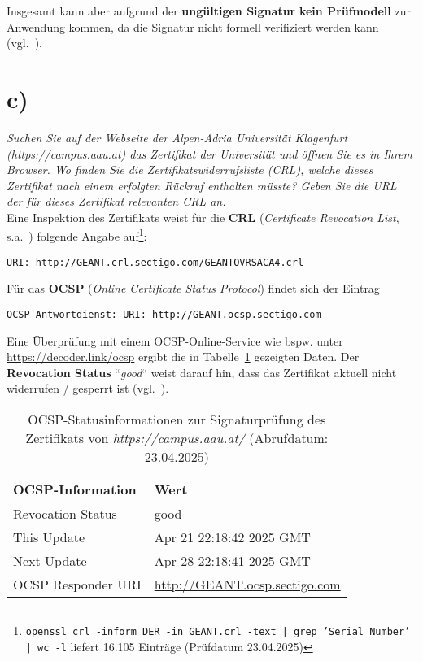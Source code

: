 \noindent
Insgesamt kann aber aufgrund der \textbf{ungültigen Signatur} \textbf{kein Prüfmodell} zur Anwendung kommen, da die Signatur nicht formell verifiziert werden kann (vgl.~\cite[27]{ITS6}).

\section{c)}

\textit{Suchen Sie auf der Webseite der Alpen-Adria Universität Klagenfurt
    (https://campus.aau.at) das Zertifikat der Universität und öffnen Sie es in Ihrem
    Browser. Wo finden Sie die Zertifikatswiderrufsliste (CRL), welche dieses Zertifikat nach einem erfolgten Rückruf enthalten müsste? Geben Sie die URL der für dieses Zertifikat relevanten CRL an.}\\

\noindent
Eine Inspektion des Zertifikats weist für die \textbf{CRL} (\textit{Certificate Revocation List}, s.a.~\cite[35 f.]{ITS6}) folgende Angabe auf\footnote{
\texttt{openssl crl -inform DER -in GEANT.crl -text | grep 'Serial Number' | wc -l} liefert 16.105 Einträge (Prüfdatum 23.04.2025)
}:

\begin{center}
    \texttt{URI: http://GEANT.crl.sectigo.com/GEANTOVRSACA4.crl}
\end{center}

\noindent
Für das \textbf{OCSP} (\textit{Online Certificate Status Protocol}) findet sich der Eintrag

\begin{center}
    \texttt{OCSP-Antwortdienst: URI: http://GEANT.ocsp.sectigo.com}
\end{center}

\noindent
Eine Überprüfung mit einem OCSP-Online-Service wie bspw. unter \url{https://decoder.link/ocsp} ergibt die in Tabelle~\ref{tab:ocsp} gezeigten Daten. Der \textbf{Revocation Status} ``\textit{good}`` weist darauf hin, dass das Zertifikat aktuell nicht widerrufen / gesperrt ist (vgl.~\cite[37]{ITS6}).


\begin{table}[h]
    \setlength{\tabcolsep}{0.5em}
    \def\arraystretch{1.5}
    \centering
    \begin{tabular}{|l|l|}
        \hline
        \textbf{OCSP-Information}     & \textbf{Wert} \\
        \hline
        Revocation Status             & good \\
        \hline
        This Update                   & Apr 21 22:18:42 2025 GMT \\
        \hline
        Next Update                   & Apr 28 22:18:41 2025 GMT \\
        \hline
        OCSP Responder URI            & \url{http://GEANT.ocsp.sectigo.com} \\
        \hline
    \end{tabular}
    \caption{OCSP-Statusinformationen zur Signaturprüfung des Zertifikats von \textit{https://campus.aau.at/} (Abrufdatum: 23.04.2025)}
    \label{tab:ocsp}
\end{table}


